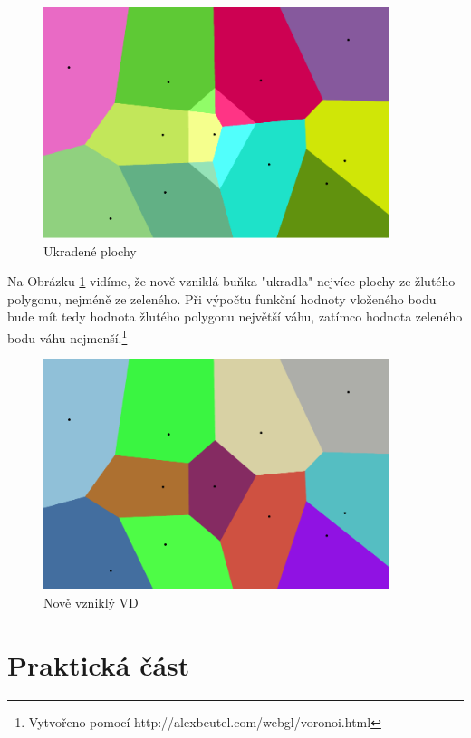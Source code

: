 \documentclass[12pt,a4paper]{article}
\begin{document}
\begin{figure}[h!]
\centering
\includegraphics[width=0.9\textwidth]{../img/canvas_1.png}
\caption{Ukradené plochy}
\label{fig:fig:canvas1}
\end{figure}

\newpage
Na Obrázku \ref{fig:fig:canvas1} vidíme, že nově vzniklá buňka "ukradla" nejvíce plochy ze žlutého polygonu, nejméně ze zeleného. Při výpočtu funkční hodnoty vloženého bodu bude mít tedy hodnota žlutého polygonu největší váhu, zatímco hodnota zeleného bodu váhu nejmenší.\footnote{Vytvořeno pomocí http://alexbeutel.com/webgl/voronoi.html}
\begin{figure}[h!]
\centering
\includegraphics[width=0.9\textwidth]{../img/canvas_2.png}
\caption{Nově vzniklý VD}
\label{fig:fig:canvas2}
\end{figure}


\newpage	
\part{Praktická část}
\end{document}
